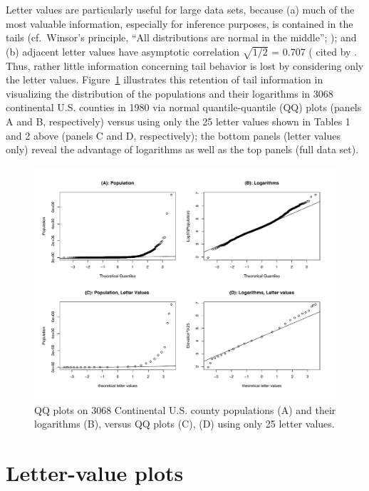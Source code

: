 \documentclass[oneside]{article}
\begin{document}
Letter values are particularly useful for large data sets, because (a) much of the most valuable information, especially for inference purposes, is contained in the tails (cf.\ Winsor's principle, ``All distributions are normal in the middle''; \citep[pg. 457]{tukey60}); and (b) adjacent letter values have asymptotic correlation $\sqrt{1/2}$ = 0.707 (\citet{mosteller46} cited by \citet[pg. 51--52]{dchlv}. Thus, rather little information concerning tail behavior is lost by considering only the letter values. Figure~\ref{qqpop4} illustrates this retention of tail information in visualizing the distribution of the populations and their logarithms in 3068 continental U.S. counties in 1980 via normal quantile-quantile (QQ) plots (panels A and B, respectively) versus using only the 25 letter values shown in Tables 1 and 2 above (panels C and D, respectively); the bottom panels (letter values only) reveal the advantage of logarithms as well as the top panels (full data set).

\begin{figure}[hbtp]
  \centering
  \includegraphics[width = 0.75 \linewidth]{qqpop4}

  \caption{QQ plots on 3068 Continental U.S. county populations (A) and their
  logarithms (B), versus QQ plots (C), (D) using only 25 letter values.}
  \label{qqpop4}
\end{figure}

\section{Letter-value plots}
\label{sec:lv-boxplots}
\end{document}
